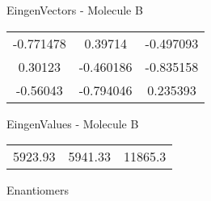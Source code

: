 \begin{multicols}{2}
\begin{center}
\vtab
 EingenVectors - Molecule B     \\
\vtab
\begin{tabular}{|c c c|}
-0.771478	 & 	0.39714	 & 	-0.497093	 \\
0.30123	 & 	-0.460186	 & 	-0.835158	 \\
-0.56043	 & 	-0.794046	 & 	0.235393
\end{tabular}

\vtab
 EingenValues - Molecule B     \\
\vtab
\begin{tabular}{|c c c|}
5923.93	 & 	5941.33	 & 	11865.3	 \\
\end{tabular}

\end{center}
\end{multicols}
\begin{center}
\vtab
\vtab
\textcolor{NavyBlue}{\Large Enantiomers}
\end{center}

 \newpage

